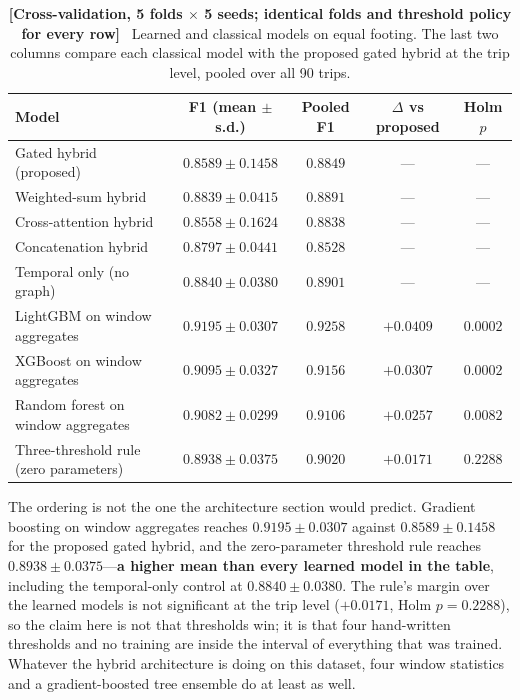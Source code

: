 \documentclass[journal]{IEEEtran}
\begin{document}
\begin{table}[!t]
  \centering
  \caption{\textbf{[Cross-validation, 5 folds $\times$ 5 seeds; identical
  folds and threshold policy for every row]}~ Learned and classical models on
  equal footing. The last two columns compare each classical model with the
  proposed gated hybrid at the trip level, pooled over all 90 trips.}
  \label{tab:classic_cv}
  \renewcommand{\arraystretch}{1.2}
  \footnotesize
  \begin{tabular}{@{}lcccc@{}}
    \toprule
    \textbf{Model} & \textbf{F1 (mean $\pm$ s.d.)} & \textbf{Pooled F1}
    & \textbf{$\Delta$ vs proposed} & \textbf{Holm $p$} \\ \midrule
    Gated hybrid (proposed) & $0.8589 \pm 0.1458$ & $0.8849$ & --- & --- \\
    Weighted-sum hybrid & $0.8839 \pm 0.0415$ & $0.8891$ & --- & --- \\
    Cross-attention hybrid & $0.8558 \pm 0.1624$ & $0.8838$ & --- & --- \\
    Concatenation hybrid & $0.8797 \pm 0.0441$ & $0.8528$ & --- & --- \\
    Temporal only (no graph) & $0.8840 \pm 0.0380$ & $0.8901$ & --- & --- \\
    \midrule
    LightGBM on window aggregates & $\bm{0.9195 \pm 0.0307}$ & $\bm{0.9258}$ & $+0.0409$ & $0.0002$ \\
    XGBoost on window aggregates & $0.9095 \pm 0.0327$ & $0.9156$ & $+0.0307$ & $0.0002$ \\
    Random forest on window aggregates & $0.9082 \pm 0.0299$ & $0.9106$ & $+0.0257$ & $0.0082$ \\
    Three-threshold rule (zero parameters) & $0.8938 \pm 0.0375$ & $0.9020$ & $+0.0171$ & $0.2288$ \\
    \bottomrule
  \end{tabular}
\end{table}

The ordering is not the one the architecture section would predict. Gradient
boosting on window aggregates reaches $0.9195 \pm 0.0307$ against
$0.8589 \pm 0.1458$ for the proposed gated hybrid, and the zero-parameter
threshold rule reaches $0.8938 \pm 0.0375$---\textbf{a higher mean than every
learned model in the table}, including the temporal-only control at
$0.8840 \pm 0.0380$. The rule's margin over the learned models is not
significant at the trip level ($+0.0171$, Holm $p = 0.2288$), so the claim
here is not that thresholds win; it is that four hand-written thresholds and
no training are inside the interval of everything that was trained. Whatever the hybrid architecture is doing on
this dataset, four window statistics and a gradient-boosted tree ensemble do
at least as well.
\end{document}
